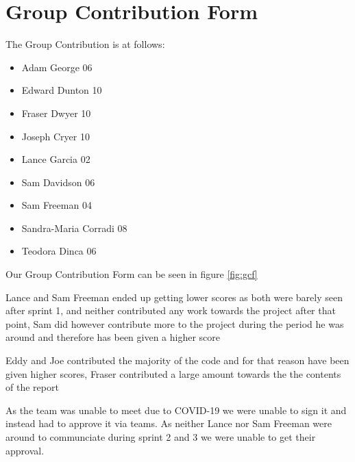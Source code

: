 \documentclass[10pt, notitlepage]{report}
\begin{document}
\section{Group Contribution Form}

The Group Contribution is at follows:
\begin{itemize}
\item Adam George			06
\item Edward Dunton		10
\item Fraser Dwyer			10
\item Joseph Cryer			10
\item Lance Garcia			02
\item Sam Davidson			06
\item Sam Freeman 			04
\item Sandra-Maria Corradi	08
\item Teodora Dinca    		06
\end{itemize}

Our Group Contribution Form can be seen in figure \ref{fig:gcf}

Lance and Sam Freeman ended up getting lower scores as both were barely seen after sprint 1, and neither contributed any work towards the project after that point, Sam did however contribute more to the project during the period he was around and therefore has been given a higher score

Eddy and Joe contributed the majority of the code and for that reason have been given higher scores, Fraser contributed a large amount towards the the contents of the report

As the team was unable to meet due to COVID-19 we were unable to sign it and instead had to approve it via teams. As neither Lance nor Sam Freeman were around to communciate during sprint 2 and 3 we were unable to get their approval.

\newpage
\end{document}
